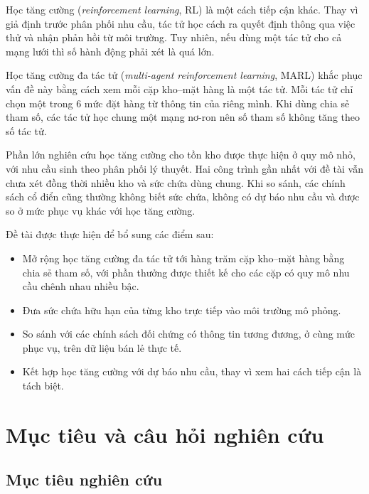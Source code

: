 Học tăng cường (\textit{reinforcement learning}, RL) là một cách tiếp cận khác. Thay vì giả định trước phân phối nhu cầu, tác tử học cách ra quyết định thông qua việc thử và nhận phản hồi từ môi trường. Tuy nhiên, nếu dùng một tác tử cho cả mạng lưới thì số hành động phải xét là quá lớn.

Học tăng cường đa tác tử (\textit{multi-agent reinforcement learning}, MARL) khắc phục vấn đề này bằng cách xem mỗi cặp kho--mặt hàng là một tác tử. Mỗi tác tử chỉ chọn một trong 6 mức đặt hàng từ thông tin của riêng mình. Khi dùng chia sẻ tham số, các tác tử học chung một mạng nơ-ron nên số tham số không tăng theo số tác tử.

Phần lớn nghiên cứu học tăng cường cho tồn kho được thực hiện ở quy mô nhỏ, với nhu cầu sinh theo phân phối lý thuyết. Hai công trình gần nhất với đề tài vẫn chưa xét đồng thời nhiều kho và sức chứa dùng chung. Khi so sánh, các chính sách cổ điển cũng thường không biết sức chứa, không có dự báo nhu cầu và được so ở mức phục vụ khác với học tăng cường.

Đề tài được thực hiện để bổ sung các điểm sau:
\begin{itemize}
    \item Mở rộng học tăng cường đa tác tử tới hàng trăm cặp kho--mặt hàng bằng chia sẻ tham số, với phần thưởng được thiết kế cho các cặp có quy mô nhu cầu chênh nhau nhiều bậc.
    \item Đưa sức chứa hữu hạn của từng kho trực tiếp vào môi trường mô phỏng.
    \item So sánh với các chính sách đối chứng có thông tin tương đương, ở cùng mức phục vụ, trên dữ liệu bán lẻ thực tế.
    \item Kết hợp học tăng cường với dự báo nhu cầu, thay vì xem hai cách tiếp cận là tách biệt.
\end{itemize}

\section{Mục tiêu và câu hỏi nghiên cứu}
\label{sec:muctieu}

\subsection{Mục tiêu nghiên cứu}
\label{subsec:muctieu}

